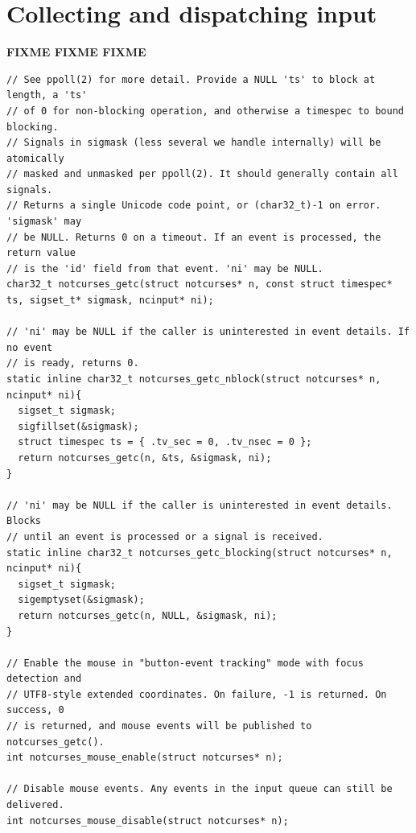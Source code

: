 \documentclass[letterpaper,10pt]{article}
\begin{document}
\newpage

\section{Collecting and dispatching input}
\label{sec:input}

\textbf{FIXME FIXME FIXME}

\begin{listing}[!htbp]
\begin{verbatim}
// See ppoll(2) for more detail. Provide a NULL 'ts' to block at length, a 'ts'
// of 0 for non-blocking operation, and otherwise a timespec to bound blocking.
// Signals in sigmask (less several we handle internally) will be atomically
// masked and unmasked per ppoll(2). It should generally contain all signals.
// Returns a single Unicode code point, or (char32_t)-1 on error. 'sigmask' may
// be NULL. Returns 0 on a timeout. If an event is processed, the return value
// is the 'id' field from that event. 'ni' may be NULL.
char32_t notcurses_getc(struct notcurses* n, const struct timespec* ts, sigset_t* sigmask, ncinput* ni);

// 'ni' may be NULL if the caller is uninterested in event details. If no event
// is ready, returns 0.
static inline char32_t notcurses_getc_nblock(struct notcurses* n, ncinput* ni){
  sigset_t sigmask;
  sigfillset(&sigmask);
  struct timespec ts = { .tv_sec = 0, .tv_nsec = 0 };
  return notcurses_getc(n, &ts, &sigmask, ni);
}

// 'ni' may be NULL if the caller is uninterested in event details. Blocks
// until an event is processed or a signal is received.
static inline char32_t notcurses_getc_blocking(struct notcurses* n, ncinput* ni){
  sigset_t sigmask;
  sigemptyset(&sigmask);
  return notcurses_getc(n, NULL, &sigmask, ni);
}

// Enable the mouse in "button-event tracking" mode with focus detection and
// UTF8-style extended coordinates. On failure, -1 is returned. On success, 0
// is returned, and mouse events will be published to notcurses_getc().
int notcurses_mouse_enable(struct notcurses* n);

// Disable mouse events. Any events in the input queue can still be delivered.
int notcurses_mouse_disable(struct notcurses* n);
\end{verbatim}
\end{listing}

\newpage
\end{document}

